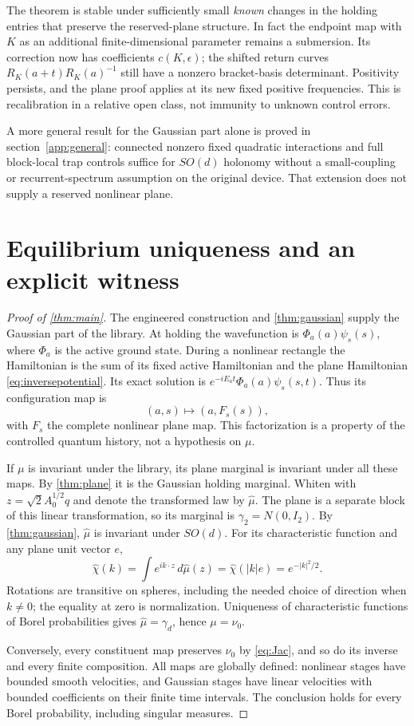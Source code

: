 \documentclass[11pt]{article}
\numberwithin{equation}{section}
\theoremstyle{definition}
\begin{document}
The theorem is stable under sufficiently small \emph{known}
changes in the holding entries that preserve the reserved-plane
structure. In fact the endpoint map with $K$ as an additional
finite-dimensional parameter remains a submersion. Its correction
now has coefficients $c(K,\epsilon)$; the shifted return curves
$R_K(a+t)R_K(a)^{-1}$ still have a nonzero bracket-basis
determinant. Positivity persists, and the plane proof applies at
its new fixed positive frequencies. This is recalibration in a
relative open class, not immunity to unknown control errors.

A more general result for the Gaussian part alone is proved in
section~\ref{app:general}: connected nonzero fixed quadratic interactions
and full block-local trap controls suffice for $SO(d)$ holonomy
without a small-coupling or recurrent-spectrum assumption on the
original device. That extension does not supply a reserved
nonlinear plane.

\section{Equilibrium uniqueness and an explicit witness}\label{sec:uniqueness}

\begin{proof}[Proof of \cref{thm:main}]
The engineered construction and \cref{thm:gaussian} supply the
Gaussian part of the library. At holding the wavefunction is
$\Phi_a(a)\psi_s(s)$, where $\Phi_a$ is the active ground state.
During a nonlinear rectangle the Hamiltonian is the sum of its
fixed active Hamiltonian and the plane Hamiltonian
\eqref{eq:inversepotential}. Its exact solution is
$e^{-iE_at}\Phi_a(a)\psi_s(s,t)$. Thus its configuration map is
\[
 (a,s)\longmapsto(a,F_s(s)),
\]
with $F_s$ the complete nonlinear plane map. This factorization
is a property of the controlled quantum history, not a hypothesis
on $\mu$.

If $\mu$ is invariant under the library, its plane marginal is
invariant under all these maps. By \cref{thm:plane} it is the
Gaussian holding marginal. Whiten with
$z=\sqrt2 A_0^{1/2}q$ and denote the transformed law by
$\widehat\mu$. The plane is a separate block of this linear
transformation, so its marginal is $\gamma_2=N(0,I_2)$.
By \cref{thm:gaussian}, $\widehat\mu$ is invariant under $SO(d)$.
For its characteristic function and any plane unit vector $e$,
\[
 \widehat\chi(k)
 =\int e^{ik\cdot z}\,d\widehat\mu(z)
 =\widehat\chi(|k|e)=e^{-|k|^2/2}.
\]
Rotations are transitive on spheres, including the needed choice
of direction when $k\ne0$; the equality at zero is normalization.
Uniqueness of characteristic functions of Borel probabilities gives
$\widehat\mu=\gamma_d$, hence $\mu=\nu_0$.

Conversely, every constituent map preserves $\nu_0$ by
\eqref{eq:Jac}, and so do its inverse and every finite composition.
All maps are globally defined: nonlinear stages have bounded smooth
velocities, and Gaussian stages have linear velocities with
bounded coefficients on their finite time intervals.
The conclusion holds for every Borel probability, including singular measures.
\end{proof}
\end{document}
